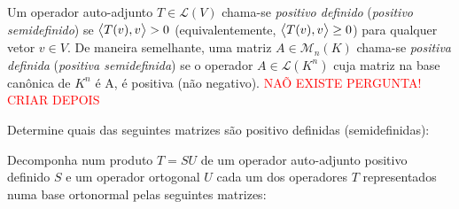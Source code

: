 \documentclass[11pt,a4paper]{article}
\begin{document}
\begin{exercicio}
Um operador auto-adjunto $T \in \mathcal{L}(V)$ chama-se \emph{positivo definido} (\emph{positivo semidefinido}) se $\left\langle T(v), v \right\rangle > 0$ (equivalentemente, $\left\langle T(v), v \right\rangle \ge 0$) para qualquer vetor $v \in V.$ De maneira semelhante, uma matriz $A \in \mathcal{M}_n(K)$ chama-se \emph{positiva definida} (\emph{positiva semidefinida}) se o operador $A \in \mathcal{L}(K^n)$ cuja matriz na base canônica de $K^n$
é A, é positiva (não negativo).
\textcolor{Red}{NAÕ EXISTE PERGUNTA! CRIAR DEPOIS}
\end{exercicio}
\solucao{}
\begin{exercicio} Determine quais das seguintes matrizes são positivo definidas (semidefinidas):
\end{exercicio}
\solucao{}
\begin{exercicio}
Decomponha num produto $T = SU$ de um operador auto-adjunto positivo definido $S$ e um operador ortogonal $U$ cada um dos operadores $T$ representados numa base ortonormal pelas seguintes matrizes:
\end{exercicio}
\solucao{}
\end{document}
